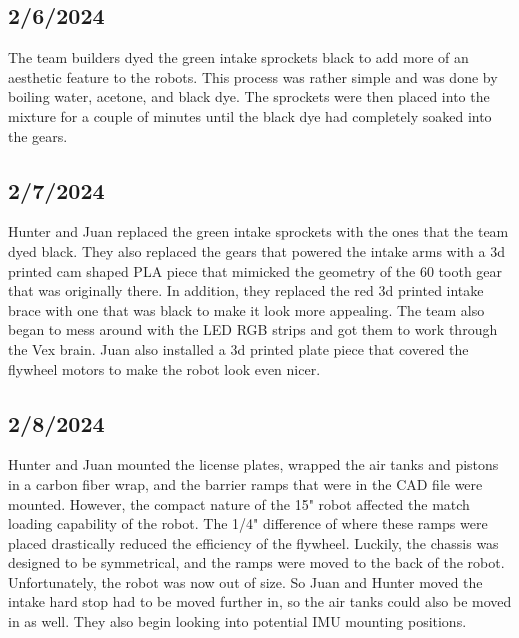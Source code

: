 \subsection{2/6/2024}
The team builders dyed the green intake sprockets black to add more of an aesthetic feature to the robots. This process
was rather simple and was done by boiling water, acetone, and black dye. The sprockets were then placed into the mixture
for a couple of minutes until the black dye had completely soaked into the gears.




\subsection{2/7/2024}
Hunter and Juan replaced the green intake sprockets with the ones that the team dyed black. They also replaced the gears
that powered the intake arms with a 3d printed cam shaped PLA piece that mimicked the geometry of the 60 tooth gear that
was originally there. In addition, they replaced the red 3d printed intake brace with one that was black to make it look
more appealing. The team also began to mess around with the LED RGB strips and got them to work through the Vex brain. 
Juan also installed a 3d printed plate piece that covered the flywheel motors to make the robot look even nicer. 


\subsection{2/8/2024}
Hunter and Juan mounted the license plates, wrapped the air tanks and pistons in a carbon fiber wrap, and the barrier ramps
that were in the CAD file were mounted. However, the compact nature of the 15" robot  affected the match loading capability 
of the robot. The 1/4" difference of where these ramps were placed drastically reduced the efficiency of the flywheel.
Luckily, the chassis was designed to be symmetrical, and the ramps were moved to the back of the robot. Unfortunately, the
robot was now out of size. So Juan and Hunter moved the intake hard stop had to be moved further in, so the air tanks could 
also be moved in as well. They also begin looking into potential IMU mounting positions. 

